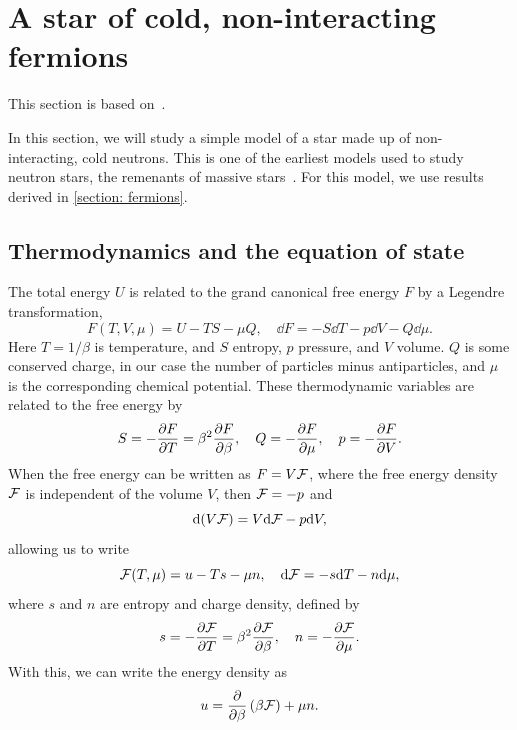 \section{A star of cold, non-interacting fermions}
\label{section: cold fermi star}

This section is based on~\autocite{glendenningCompactStarsNuclear2012,andersenIntroductionStatisticalMechanics2012,kapustaFiniteTemperatureFieldTheory2006}.

In this section, we will study a simple model of a star made up of non-interacting, cold neutrons.
This is one of the earliest models used to study neutron stars, the remenants of massive stars~\autocite{glendenningCompactStarsNuclear2012}.
For this model, we use results derived in \autoref{section: fermions}.



\subsection{Thermodynamics and the equation of state}

The total energy $U$ is related to the grand canonical free energy $F$ by a Legendre transformation,
%
\begin{equation}
    F(T, V, \mu) = U - T S - \mu Q, \quad \dd F = - S \dd T - p \dd V - Q \dd \mu.
\end{equation}
%
Here $T = {1}/{\beta}$ is temperature, and $S$ entropy,  $p$ pressure, and $V$ volume.
$Q$ is some conserved charge, in our case the number of particles minus antiparticles, and $\mu$ is the corresponding chemical potential.
These thermodynamic variables are related to the free energy by
%
\begin{equation}
    S = - \pdv{F}{T} = \beta^2 \pdv{F}{\beta}, \quad
    Q = - \pdv{F}{\mu}, \quad
    p = - \pdv{F}{V}.
\end{equation}
%
When the free energy can be written as $F = V \mathcal{F}$, where the free energy density $\mathcal{F}$ is independent of the volume $V$, then $\mathcal{F} = - p$ and
%
\begin{equation}
    \text{d} (V \mathcal{F}) = V \text{d} \mathcal{F} - p \text{d} V,
\end{equation}
%
allowing us to write
%
\begin{equation}
    \mathcal{F}(T, \mu) = u - Ts - \mu n, \quad
    \text{d} \mathcal{F} = -s \text{d} T - n \text{d} \mu,
\end{equation}
% 
where $s$ and $n$ are entropy and charge density, defined by
%
\begin{equation}
    s = - \pdv{\mathcal{F}}{T} = \beta^2 \pdv{\mathcal{F}}{\beta}, \quad
    n = - \pdv{\mathcal{F}}{\mu}.
\end{equation}
%
With this, we can write the energy density as~\autocite{andersenIntroductionStatisticalMechanics2012}
%
\begin{equation}
    u = \pdv{}{\beta} \left(\beta \mathcal{F}\right) + \mu n.
\end{equation}
%

